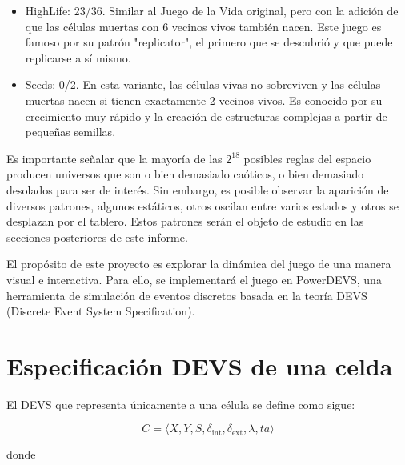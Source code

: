 \documentclass[]{article}
\newcommand{\dint}{\delta_{\text{int}}}
\newcommand{\dext}{\delta_{\text{ext}}}
\begin{document}
\begin{itemize}
  \item HighLife: 23/36. Similar al Juego de la Vida original, pero con la adición de que las células muertas con 6 vecinos vivos también nacen. Este juego es famoso por su patrón "replicator", el primero que se descubrió y que puede replicarse a sí mismo.
  \item Seeds: 0/2. En esta variante, las células vivas no sobreviven y las células muertas nacen si tienen exactamente 2 vecinos vivos. Es conocido por su crecimiento muy rápido y la creación de estructuras complejas a partir de pequeñas semillas.
\end{itemize}

Es importante señalar que la mayoría de las $2^18$ posibles reglas del espacio producen universos que son o bien demasiado caóticos, o bien demasiado desolados para ser de interés. Sin embargo, es posible observar la aparición de diversos patrones, algunos  estáticos, otros oscilan entre varios estados y otros se desplazan por el tablero. Estos patrones serán el objeto de estudio en las secciones posteriores de este informe.

El propósito de este proyecto es explorar la dinámica del juego de una manera visual e interactiva. Para ello, se implementará el juego en PowerDEVS, una herramienta de simulación de eventos discretos basada en la teoría DEVS (Discrete Event System Specification).

\section{Especificación DEVS de una celda}

El DEVS que representa únicamente a una célula se define como sigue:

\[ C = \langle X, Y, S, \dint, \dext, \lambda, ta \rangle \]

donde
\end{document}
